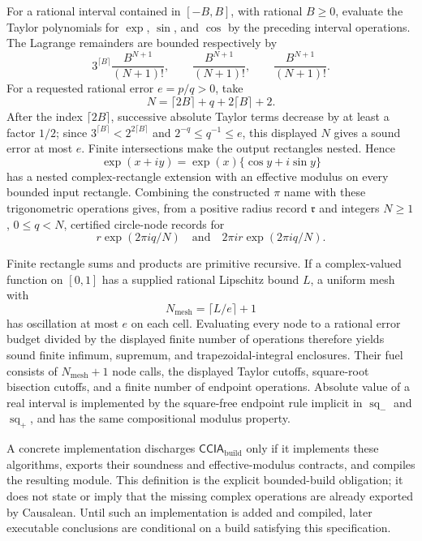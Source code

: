 For a rational interval contained in \([-B,B]\), with rational \(B\ge0\), evaluate the Taylor polynomials for \(\exp\), \(\sin\), and \(\cos\) by the preceding interval operations.  The Lagrange remainders are bounded respectively by
\[
 3^{\lceil B\rceil}\frac{B^{N+1}}{(N+1)!},
 \qquad
 \frac{B^{N+1}}{(N+1)!},
 \qquad
 \frac{B^{N+1}}{(N+1)!}.
\]
For a requested rational error \(e=p/q>0\), take
\[
 N=\lceil2B\rceil+q+2\lceil B\rceil+2.
\]
After the index \(\lceil2B\rceil\), successive absolute Taylor terms decrease by at least a factor \(1/2\); since \(3^{\lceil B\rceil}<2^{2\lceil B\rceil}\) and \(2^{-q}\le q^{-1}\le e\), this displayed \(N\) gives a sound error at most \(e\).  Finite intersections make the output rectangles nested.  Hence
\[
 \exp(x+iy)=\exp(x)\{\cos y+i\sin y\}
\]
has a nested complex-rectangle extension with an effective modulus on every bounded input rectangle.  Combining the constructed \(\pi\) name with these trigonometric operations gives, from a positive radius record \(\mathfrak r\) and integers \(N\ge1\), \(0\le q<N\), certified circle-node records for
\[
 r\exp(2\pi iq/N)
 \quad\text{and}\quad
 2\pi i r\exp(2\pi iq/N).
\]

Finite rectangle sums and products are primitive recursive.  If a complex-valued function on \([0,1]\) has a supplied rational Lipschitz bound \(L\), a uniform mesh with
\[
 N_{\mathrm{mesh}}=\lceil L/e\rceil+1
\]
has oscillation at most \(e\) on each cell.  Evaluating every node to a rational error budget divided by the displayed finite number of operations therefore yields sound finite infimum, supremum, and trapezoidal-integral enclosures.  Their fuel consists of \(N_{\mathrm{mesh}}+1\) node calls, the displayed Taylor cutoffs, square-root bisection cutoffs, and a finite number of endpoint operations.  Absolute value of a real interval is implemented by the square-free endpoint rule implicit in \(\operatorname{sq}_{-}\) and \(\operatorname{sq}_{+}\), and has the same compositional modulus property.

A concrete implementation discharges \(\mathsf{CCIA}_{\mathrm{build}}\) only if it implements these algorithms, exports their soundness and effective-modulus contracts, and compiles the resulting module.  This definition is the explicit bounded-build obligation; it does not state or imply that the missing complex operations are already exported by Causalean.  Until such an implementation is added and compiled, later executable conclusions are conditional on a build satisfying this specification.